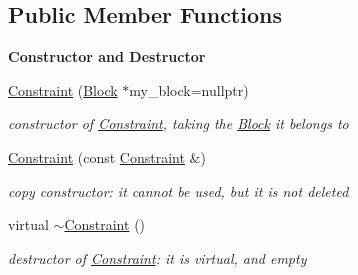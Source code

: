 \subsection*{Public Member Functions}
\begin{Indent}\textbf{ Constructor and Destructor}\par
\begin{DoxyCompactItemize}
\item 
\mbox{\hyperlink{class_s_m_spp__di__unipi__it_1_1_constraint_a2877d5b993460277b70f1dbb6905f89e}{Constraint}} (\mbox{\hyperlink{class_s_m_spp__di__unipi__it_1_1_block}{Block}} $\ast$my\+\_\+block=nullptr)
\begin{DoxyCompactList}\small\item\em constructor of \mbox{\hyperlink{class_s_m_spp__di__unipi__it_1_1_constraint}{Constraint}}, taking the \mbox{\hyperlink{class_s_m_spp__di__unipi__it_1_1_block}{Block}} it belongs to \end{DoxyCompactList}\item 
\mbox{\hyperlink{class_s_m_spp__di__unipi__it_1_1_constraint_a1b46be6cc7a0e63b96a286617403d86b}{Constraint}} (const \mbox{\hyperlink{class_s_m_spp__di__unipi__it_1_1_constraint}{Constraint}} \&)
\begin{DoxyCompactList}\small\item\em copy constructor\+: it cannot be used, but it is not deleted \end{DoxyCompactList}\item 
\mbox{\label{class_s_m_spp__di__unipi__it_1_1_constraint_a65f2b59f5bc1435bf439482d885b0c0a}} 
virtual \mbox{\hyperlink{class_s_m_spp__di__unipi__it_1_1_constraint_a65f2b59f5bc1435bf439482d885b0c0a}{$\sim$\+Constraint}} ()
\begin{DoxyCompactList}\small\item\em destructor of \mbox{\hyperlink{class_s_m_spp__di__unipi__it_1_1_constraint}{Constraint}}\+: it is virtual, and empty \end{DoxyCompactList}\end{DoxyCompactItemize}
\end{Indent}
